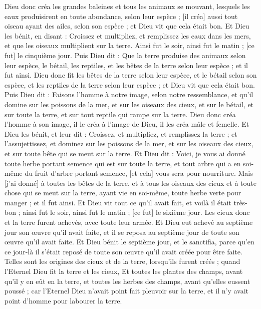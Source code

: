 \begin{multicols}{2}
Dieu donc créa les grandes baleines et tous les animaux se mouvant, lesquels les eaux produisirent en toute abondance, selon leur espèce ; [il créa] aussi tout oiseau ayant des ailes, selon son espèce ; et Dieu vit que cela était bon.
Et Dieu les bénit, en disant : Croissez et multipliez, et remplissez les eaux dans les mers, et que les oiseaux multiplient sur la terre.
Ainsi fut le soir, ainsi fut le matin ; [ce fut] le cinquième jour.
Puis Dieu dit : Que la terre produise des animaux selon leur espèce, le bétail, les reptiles, et les bêtes de la terre selon leur espèce ; et il fut ainsi.
Dieu donc fit les bêtes de la terre selon leur espèce, et le bétail selon son espèce, et les reptiles de la terre selon leur espèce ; et Dieu vit que cela était bon.
Puis Dieu dit : Faisons l'homme à notre image, selon notre ressemblance, et qu'il domine sur les poissons de la mer, et sur les oiseaux des cieux, et sur le bétail, et sur toute la terre, et sur tout reptile qui rampe sur la terre.
Dieu donc créa l'homme à son image, il le créa à l'image de Dieu, il les créa mâle et femelle.
Et Dieu les bénit, et leur dit : Croissez, et multipliez, et remplissez la terre ; et l'assujettissez, et dominez sur les poissons de la mer, et sur les oiseaux des cieux, et sur toute bête qui se meut sur la terre.
Et Dieu dit : Voici, je vous ai donné toute herbe portant semence qui est sur toute la terre, et tout arbre qui a en soi-même du fruit d'arbre portant semence, [et cela] vous sera pour nourriture.
Mais [j'ai donné] à toutes les bêtes de la terre, et à tous les oiseaux des cieux et à toute chose qui se meut sur la terre, ayant vie en soi-même, toute herbe verte pour manger ; et il fut ainsi.
Et Dieu vit tout ce qu'il avait fait, et voilà il était très-bon ; ainsi fut le soir, ainsi fut le matin ; [ce fut] le sixième jour.
\VerseOne{}Les cieux donc et la terre furent achevés, avec toute leur armée.
Et Dieu eut achevé au septième jour son œuvre qu'il avait faite, et il se reposa au septième jour de toute son œuvre qu'il avait faite.
Et Dieu bénit le septième jour, et le sanctifia, parce qu'en ce jour-là il s'était reposé de toute son œuvre qu'il avait créée pour être faite.
Telles sont les origines des cieux et de la terre, lorsqu'ils furent créés ; quand l'Eternel Dieu fit la terre et les cieux,
Et toutes les plantes des champs, avant qu'il y en eût en la terre, et toutes les herbes des champs, avant qu'elles eussent poussé ; car l'Eternel Dieu n'avait point fait pleuvoir sur la terre, et il n'y avait point d'homme pour labourer la terre.

\end{multicols}
